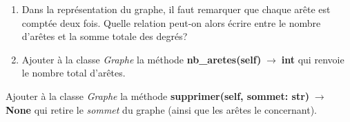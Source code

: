 \documentclass[a4paper,11pt]{article}
\begin{document}
\begin{Form}
\begin{exo}
\begin{enumerate}
\item Dans la représentation du graphe, il faut remarquer que chaque arête est comptée deux fois. Quelle relation peut-on alors écrire entre le nombre d'arêtes et la somme totale des degrés?
\item Ajouter à la classe \emph{Graphe} la méthode \textbf{nb\_aretes(self)$\;\rightarrow\;$int} qui renvoie le nombre total d'arêtes.
\end{enumerate}
\end{exo}
\begin{exo}
Ajouter à la classe \emph{Graphe} la méthode \textbf{supprimer(self, sommet: str)$\;\rightarrow\;$None} qui retire le \emph{sommet} du graphe (ainsi que les arêtes le concernant).
\end{exo}
\end{Form}
\end{document}
